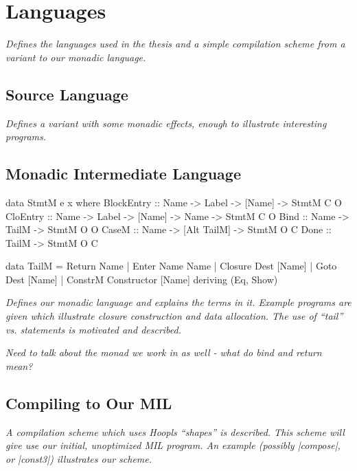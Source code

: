 \documentclass[12pt]{report}
\begin{document}
           {\doublespacing}{}
           \chapter{Languages}

\emph{Defines the languages used in the thesis and a simple
  compilation scheme from a \lamA variant to our monadic language. }

\section{Source Language}

\emph{Defines a \lamA variant with some monadic effects, enough to
  illustrate interesting programs.}

\section{Monadic Intermediate Language}





\begin{code}
data StmtM e x where
  BlockEntry :: Name -> Label -> [Name] -> StmtM C O
  CloEntry :: Name -> Label -> [Name] -> Name -> StmtM C O
  Bind :: Name -> TailM -> StmtM O O
  CaseM :: Name -> [Alt TailM] -> StmtM O C
  Done :: TailM -> StmtM O C

data TailM = Return Name 
  | Enter Name Name
  | Closure Dest [Name]
  | Goto Dest [Name] 
  | ConstrM Constructor [Name]
  deriving (Eq, Show)
\end{code}

\emph{Defines our monadic language and explains the terms in
  it. Example programs are given which illustrate closure construction
  and data allocation. The use of ``tail'' vs. statements is motivated
  and described. }

\emph{Need to talk about the monad we work in as well - what 
do bind and return mean?}

\section{Compiling to Our MIL}
\emph{A compilation scheme which uses Hoopls ``shapes'' is
described. This scheme will give use our initial, unoptimized
MIL program. An example (possibly |compose|, or |const3|) illustrates 
our scheme.}
\end{document}

